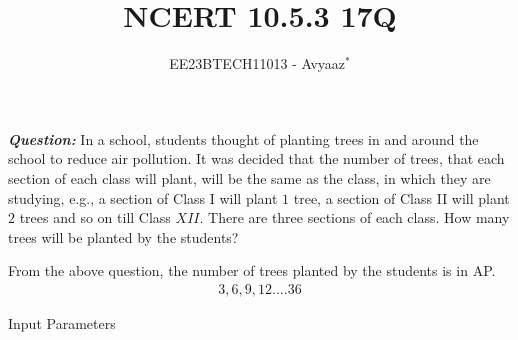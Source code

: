 \documentclass[journal,12pt,twocolumn]{IEEEtran}
\theoremstyle{remark}
\begin{document}

\vspace{3cm}

\title{NCERT 10.5.3 17Q}
\author{EE23BTECH11013 - Avyaaz$^{*}$%
}
\maketitle
\newpage
\bigskip

\renewcommand{\thefigure}{\arabic{figure}}
\renewcommand{\thetable}{\arabic{table}}

\large\textbf{\textsl{Question:}}
In a school, students thought of planting trees in and around the school to reduce air
pollution. It was decided that the number of trees, that each section of each class will
plant, will be the same as the class, in which they are studying, e.g., a section of Class I
will plant $1$ tree, a section of Class II will plant $2$ trees and so on till Class $XII$. There are
three sections of each class. How many trees will be planted by the students?\\
\solution

From the above question, the number of trees planted by the students is in AP.
\begin{align}
 3, 6, 9, 12 .... 36   
\end{align}
\begin{table}[htbp]
\setlength{\extrarowheight}{8pt}
\centering

\caption{Input Parameters}
\label{tab:parameter.10.5.3.17}
\end{table}
\end{document}
